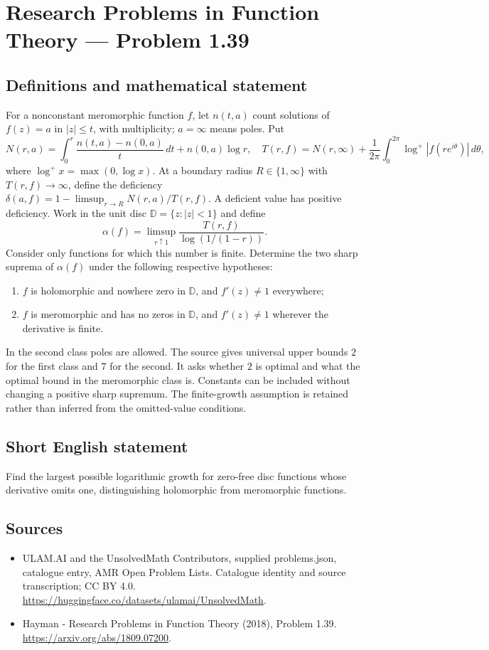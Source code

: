 \documentclass[11pt,a4paper]{article}
\begin{document}
\section*{Research Problems in Function Theory — Problem 1.39}\label{statement}

\subsection{Definitions and mathematical statement}
For a nonconstant meromorphic function $f$, let $n(t,a)$ count solutions of $f(z)=a$ in $|z|\le t$, with multiplicity; $a=\infty$ means poles. Put
\[
N(r,a)=\int_0^r\frac{n(t,a)-n(0,a)}t\,dt+n(0,a)\log r,
\quad T(r,f)=N(r,\infty)+\frac1{2\pi}\int_0^{2\pi}\log^+|f(re^{i\theta})|\,d\theta,
\]
where $\log^+x=\max(0,\log x)$. At a boundary radius $R\in\{1,\infty\}$ with $T(r,f)\to\infty$, define the deficiency
$\delta(a,f)=1-\limsup_{r\to R}N(r,a)/T(r,f)$. A deficient value has positive deficiency.
Work in the unit disc $\mathbb D=\{z:|z|<1\}$ and define
\[
\alpha(f)=\limsup_{r\uparrow1}\frac{T(r,f)}{\log(1/(1-r))}.
\]
Consider only functions for which this number is finite. Determine the two sharp suprema of $\alpha(f)$ under the following respective hypotheses:
\begin{enumerate}
\item $f$ is holomorphic and nowhere zero in $\mathbb D$, and $f'(z)\ne1$ everywhere;
\item $f$ is meromorphic and has no zeros in $\mathbb D$, and $f'(z)\ne1$ wherever the derivative is finite.
\end{enumerate}
In the second class poles are allowed. The source gives universal upper bounds $2$ for the first class and $7$ for the second. It asks whether $2$ is optimal and what the optimal bound in the meromorphic class is. Constants can be included without changing a positive sharp supremum. The finite-growth assumption is retained rather than inferred from the omitted-value conditions.
\subsection{Short English statement}
Find the largest possible logarithmic growth for zero-free disc functions whose derivative omits one, distinguishing holomorphic from meromorphic functions.
\subsection{Sources}
\begin{itemize}
\item[S1] ULAM.AI and the UnsolvedMath Contributors, supplied problems.json, catalogue entry, AMR Open Problem Lists. Catalogue identity and source transcription; CC BY 4.0.
\url{https://huggingface.co/datasets/ulamai/UnsolvedMath}.
\item[S2] Hayman - Research Problems in Function Theory (2018), Problem 1.39. 
\url{https://arxiv.org/abs/1809.07200}.
\end{itemize}
\end{document}
